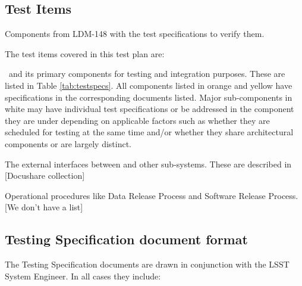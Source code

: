 \subsection{Test Items}

\begin{table}
	\caption{Components from LDM-148 with the test specifications to verify them. \label{tab:testspecs}}
	
\end{table}

The test items covered in this test plan are:

\begin{itemize_single}
\item \product \ and its primary components for testing and integration purposes. These are listed in Table \ref{tab:testspecs}. All components listed in orange and yellow have specifications in the corresponding documents listed. Major sub-components in white may have individual test specifications or be addressed in the component they are under depending on applicable factors such as whether they are scheduled for testing at the same time and/or whether they share architectural components or are largely distinct. 

\item The external interfaces between \product and other sub-systems. These are described in [Docushare collection]

\item Operational procedures like Data Release Process and Software Release Process. [We don't have a list]

\end{itemize_single}


  
\subsection{Testing Specification document format}\label{sect:tsform}

The Testing Specification documents are drawn in conjunction with the LSST System Engineer. In all cases they include:

